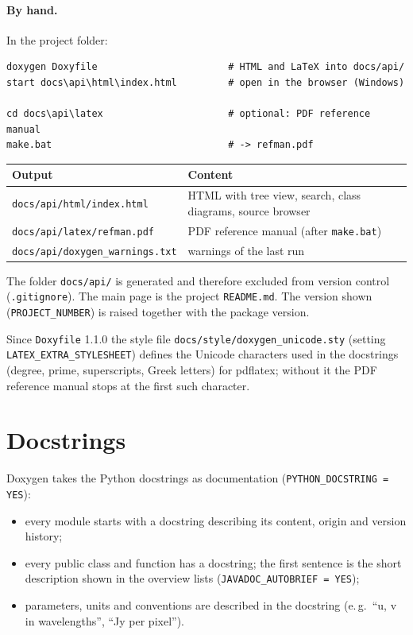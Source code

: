 \paragraph*{By hand.} In the project folder:
\begin{lstlisting}[basicstyle=\ttfamily\footnotesize, frame=single]
doxygen Doxyfile                       # HTML and LaTeX into docs/api/
start docs\api\html\index.html         # open in the browser (Windows)

cd docs\api\latex                      # optional: PDF reference manual
make.bat                               # -> refman.pdf
\end{lstlisting}

\begin{center}
\begin{tabularx}{\linewidth}{@{}lL@{}}
\toprule
Output & Content \\
\midrule
\texttt{docs/api/html/index.html} & HTML with tree view, search, class
  diagrams, source browser \\
\texttt{docs/api/latex/refman.pdf} & PDF reference manual (after
  \texttt{make.bat}) \\
\texttt{docs/api/doxygen\_warnings.txt} & warnings of the last run \\
\bottomrule
\end{tabularx}
\end{center}

The folder \texttt{docs/api/} is generated and therefore excluded from
version control (\texttt{.gitignore}). The main page is the project
\texttt{README.md}. The version shown (\texttt{PROJECT\_NUMBER}) is
raised together with the package version.

Since \texttt{Doxyfile} 1.1.0 the style file
\texttt{docs/style/doxygen\_unicode.sty} (setting
\texttt{LATEX\_EXTRA\_STYLESHEET}) defines the Unicode characters used in
the docstrings (degree, prime, superscripts, Greek letters) for pdflatex;
without it the PDF reference manual stops at the first such character.

\section{Docstrings}

Doxygen takes the Python docstrings as documentation
(\texttt{PYTHON\_DOCSTRING = YES}):
\begin{itemize}
  \item every module starts with a docstring describing its content,
        origin and version history;
  \item every public class and function has a docstring; the first
        sentence is the short description shown in the overview lists
        (\texttt{JAVADOC\_AUTOBRIEF = YES});
  \item parameters, units and conventions are described in the
        docstring (e.\,g.\ \enquote{u, v in wavelengths}, \enquote{Jy per
        pixel}).
\end{itemize}
